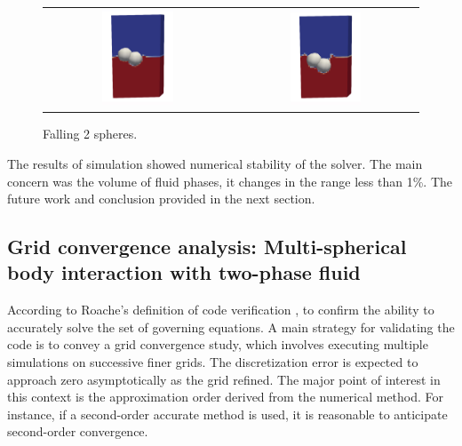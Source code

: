 \begin{figure}[!ht]
  \centering
  \begin{tabular}{cc}
    \includegraphics[width=0.4\textwidth]{Images/chap4/2_sph_2.jpg} & \includegraphics[width=0.4\textwidth]{Images/chap4/2_sph_1.jpg} \\
  \end{tabular}
  \caption{Falling 2 spheres.}
  \label{fig:two-phase exp}
\end{figure}
The results of simulation showed numerical stability of the solver. The main concern was the volume of fluid phases, it changes in the range less than 1\%. The future work and conclusion provided in the next section.

\subsection{Grid convergence analysis: Multi-spherical body interaction with two-phase fluid}

According to Roache's definition of code verification \cite{roache1998verification}, to confirm the ability to accurately solve the set of governing equations. A main strategy for validating the code is to convey a grid convergence study, which involves executing multiple simulations on successive finer grids. The discretization error is expected to approach zero asymptotically as the grid refined. The major point of interest in this context is the approximation order derived from the numerical method. For instance, if a second-order accurate method is used, it is reasonable to anticipate second-order convergence.

